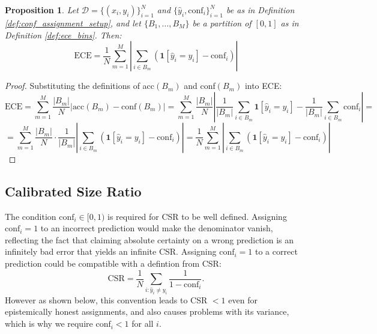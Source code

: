 \documentclass{article}
\theoremstyle{plain}
\newtheorem{theorem}{Proposition}
\theoremstyle{definition}
\theoremstyle{remark}
\begin{document}
\begin{theorem}  \label{theorem:ECE_from_indicator}
Let $\mathcal{D} = \{(x_i, y_i)\}_{i=1}^N$ and $\{\hat{y}_i, \text{conf}_i\}_{i=1}^N$ be as in Definition \ref{def:conf_assignment_setup}, and let $\{B_1, \ldots, B_M\}$ be a partition of $[0,1]$ as in Definition \ref{def:ece_bins}. Then: \[
\text{ECE} = \frac{1}{N}\sum_{m=1}^M \left| \sum_{i \in B_m} \left(\mathbf{1}[\hat{y}_i = y_i] - \text{conf}_i\right) \right|
\]
\end{theorem}
\begin{proof}
Substituting the definitions of acc$(B_m)$ and conf$(B_m)$ into ECE: \[
\text{ECE} = \sum_{m=1}^M \frac{|B_m|}{N} \left| \text{acc}(B_m) - \text{conf}(B_m) \right| = \sum_{m=1}^M \frac{|B_m|}{N} \left| \frac{1}{|B_m|}\sum_{i \in B_m} \mathbf{1}[\hat{y}_i = y_i] - \frac{1}{|B_m|}\sum_{i \in B_m} \text{conf}_i \right| = 
\]
\[ = \sum_{m=1}^M \frac{|B_m|}{N} \cdot \frac{1}{|B_m|}\left| \sum_{i \in B_m} \left(\mathbf{1}[\hat{y}_i = y_i] - \text{conf}_i\right) \right| = \frac{1}{N}\sum_{m=1}^M \left| \sum_{i \in B_m} \left(\mathbf{1}[\hat{y}_i = y_i] - \text{conf}_i\right) \right| \]
\end{proof}
\bigskip




\subsection{Calibrated Size Ratio}

The condition $\text{conf}_i \in [0,1)$ is required for CSR to be well defined. Assigning $\text{conf}_i = 1$ to an incorrect prediction would make the denominator vanish, reflecting the fact that claiming absolute certainty on a wrong prediction is an infinitely bad error that yields an infinite CSR. Assigning $\text{conf}_i = 1$ to a correct prediction could be compatible with a defintion from CSR: \[
\text{CSR} = \frac{1}{N}\sum_{i:\hat{y}_i \neq y_i} \frac{1}{1 - \text{conf}_i}.
\] 
However as shown below, this convention leads to CSR $< 1$ even for epistemically honest assignments, and also causes problems with its variance, which is why we require $\text{conf}_i < 1$ for all $i$.
\bigskip
\end{document}
